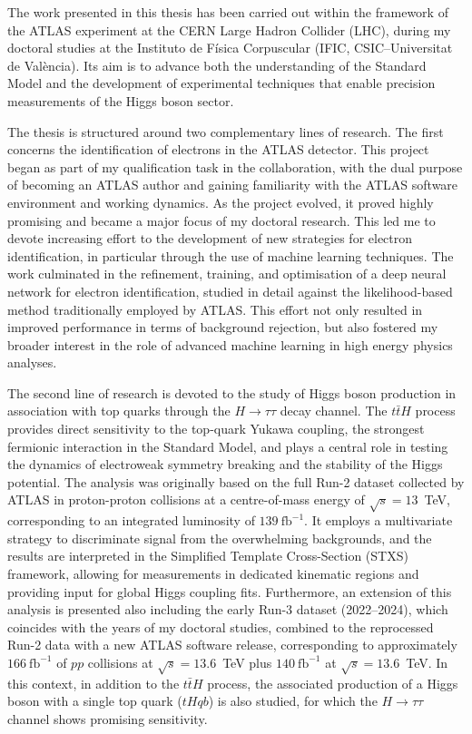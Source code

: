 The work presented in this thesis has been carried out within the framework of the ATLAS experiment at the CERN Large Hadron Collider (LHC), during my doctoral studies at the Instituto de Física Corpuscular (IFIC, CSIC–Universitat de València). Its aim is to advance both the understanding of the Standard Model and the development of experimental techniques that enable precision measurements of the Higgs boson sector.

The thesis is structured around two complementary lines of research. The first concerns the identification of electrons in the ATLAS detector. This project began as part of my qualification task in the collaboration, with the dual purpose of becoming an ATLAS author and gaining familiarity with the ATLAS software environment and working dynamics. As the project evolved, it proved highly promising and became a major focus of my doctoral research. This led me to devote increasing effort to the development of new strategies for electron identification, in particular through the use of machine learning techniques. The work culminated in the refinement, training, and optimisation of a deep neural network for electron identification, studied in detail against the likelihood-based method traditionally employed by ATLAS. This effort not only resulted in improved performance in terms of background rejection, but also fostered my broader interest in the role of advanced machine learning in high energy physics analyses.

The second line of research is devoted to the study of Higgs boson production in association with top quarks through the $H\to\tau\tau$ decay channel. The $t\bar{t}H$ process provides direct sensitivity to the top-quark Yukawa coupling, the strongest fermionic interaction in the Standard Model, and plays a central role in testing the dynamics of electroweak symmetry breaking and the stability of the Higgs potential. The analysis was originally based on the full Run-2 dataset collected by ATLAS in proton-proton collisions at a centre-of-mass energy of $\sqrt{s} = 13$~TeV, corresponding to an integrated luminosity of $139~\mathrm{fb}^{-1}$. It employs a multivariate strategy to discriminate signal from the overwhelming backgrounds, and the results are interpreted in the Simplified Template Cross-Section (STXS) framework, allowing for measurements in dedicated kinematic regions and providing input for global Higgs coupling fits. Furthermore, an extension of this analysis is presented also including the early Run-3 dataset (2022–2024), which coincides with the years of my doctoral studies, combined to the reprocessed Run-2 data with a new ATLAS software release, corresponding to approximately $166~\mathrm{fb}^{-1}$ of $pp$ collisions at $\sqrt{s} = 13.6$~TeV plus $140~\mathrm{fb}^{-1}$ at $\sqrt{s} = 13.6$~TeV. In this context, in addition to the $t\bar{t}H$ process, the associated production of a Higgs boson with a single top quark ($tHqb$) is also studied, for which the $H \to \tau\tau$ channel shows promising sensitivity.

